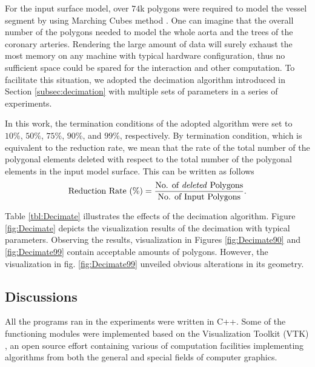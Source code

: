 For the input surface model, over $74$k polygons were required to model the vessel segment by using Marching Cubes method \cite{Lorensen1987MC}.
One can imagine that the overall number of the polygons needed to model the whole aorta and the trees of the coronary arteries.
Rendering the large amount of data will surely exhaust the most memory on any machine with typical hardware configuration, thus no sufficient space could be spared for the interaction and other computation.
To facilitate this situation, we adopted the decimation algorithm introduced in Section \ref{subsec:decimation} with multiple sets of parameters in a series of experiments. %

In this work, the termination conditions of the adopted algorithm were set to $10\%$, $50\%$, $75\%$, $90\%$, and $99\%$, respectively.
By termination condition, which is equivalent to the reduction rate, we mean that the rate of the total number of the polygonal elements deleted with respect to the total number of the polygonal elements in the input model surface. %
This can be written as follows
\begin{equation}
\label{eqn:ReductionRate}
\text{Reduction Rate (\%)} = \frac{\text{No. of \emph{deleted} Polygons}}{\text{No. of Input Polygons}}.
\end{equation}

Table \ref{tbl:Decimate} illustrates the effects of the decimation algorithm.
Figure \ref{fig:Decimate} depicts the visualization results of the decimation with typical parameters.
Observing the results, visualization in Figures \ref{fig:Decimate90} and \ref{fig:Decimate99} contain acceptable amounts of polygons.
However, the visualization in fig. \ref{fig:Decimate99} unveiled obvious alterations in its geometry.

\subsection{Discussions}

All the programs ran in the experiments were written in C++.
Some of the functioning modules were implemented based on the Visualization Toolkit (VTK) \cite{Schroeder2000VTK}, an open source effort containing various of computation facilities implementing algorithms from both the general and special fields of computer graphics. %

